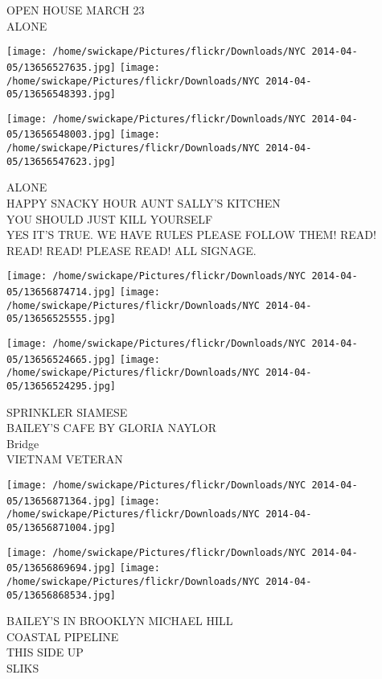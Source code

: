 \documentclass[10pt,letterpaper]{article}
\begin{document}
OPEN HOUSE MARCH 23\\
ALONE\\
\pagebreak

\texttt{[image: /home/swickape/Pictures/flickr/Downloads/NYC 2014-04-05/13656527635.jpg]}
\texttt{[image: /home/swickape/Pictures/flickr/Downloads/NYC 2014-04-05/13656548393.jpg]}

\texttt{[image: /home/swickape/Pictures/flickr/Downloads/NYC 2014-04-05/13656548003.jpg]}
\texttt{[image: /home/swickape/Pictures/flickr/Downloads/NYC 2014-04-05/13656547623.jpg]}

ALONE\\
HAPPY SNACKY HOUR AUNT SALLY'S KITCHEN\\
YOU SHOULD JUST KILL YOURSELF\\
YES IT'S TRUE.  WE HAVE RULES PLEASE FOLLOW THEM!  READ! READ! READ! PLEASE READ! ALL SIGNAGE.\\
\pagebreak

\texttt{[image: /home/swickape/Pictures/flickr/Downloads/NYC 2014-04-05/13656874714.jpg]}
\texttt{[image: /home/swickape/Pictures/flickr/Downloads/NYC 2014-04-05/13656525555.jpg]}

\texttt{[image: /home/swickape/Pictures/flickr/Downloads/NYC 2014-04-05/13656524665.jpg]}
\texttt{[image: /home/swickape/Pictures/flickr/Downloads/NYC 2014-04-05/13656524295.jpg]}

SPRINKLER SIAMESE\\
BAILEY'S CAFE BY GLORIA NAYLOR\\
Bridge\\
VIETNAM VETERAN\\
\pagebreak

\texttt{[image: /home/swickape/Pictures/flickr/Downloads/NYC 2014-04-05/13656871364.jpg]}
\texttt{[image: /home/swickape/Pictures/flickr/Downloads/NYC 2014-04-05/13656871004.jpg]}

\texttt{[image: /home/swickape/Pictures/flickr/Downloads/NYC 2014-04-05/13656869694.jpg]}
\texttt{[image: /home/swickape/Pictures/flickr/Downloads/NYC 2014-04-05/13656868534.jpg]}

BAILEY'S IN BROOKLYN MICHAEL HILL\\
COASTAL PIPELINE\\
THIS SIDE UP\\
SLIKS\\
\pagebreak
\end{document}

